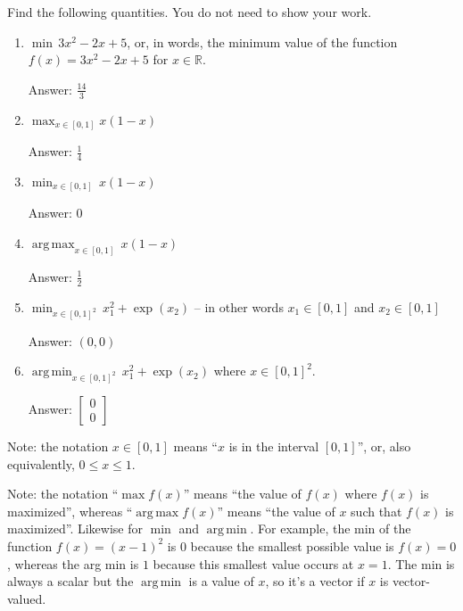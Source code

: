 \documentclass{article}
\newcommand{\blu}[1]{{\textcolor{blu}{#1}}}
\newenvironment{answer}{\par\begingroup\color{gre}Answer: }{\endgroup}
\let\ask\blu
\def\R{\mathbb{R}}
\DeclareMathOperator*{\argmax}{arg\,max}
\DeclareMathOperator*{\argmin}{arg\,min}
\begin{document}
  \ask{Find the following quantities.} You do not need to show your work.


  \begin{enumerate}
  \item $\min \, 3x^2-2x+5$, or, in words, the minimum value of the function $f(x) = 3x^2 -2x + 5$ for $x \in \R$.
  \begin{answer}
  $
  \frac{14}{3}
  $
  \end{answer}
  \item $\max_{x \in [0, 1]} x(1-x)$
  \begin{answer}
  $
  \frac{1}{4}
  $
  \end{answer}
  \item $\min_{x \in [0, 1]} \, x(1-x)$
  \begin{answer}
  0
  \end{answer}
  \item $\argmax_{x \in [0,1]} \, x(1-x)$
  \begin{answer}
  $
  \frac{1}{2}
  $
  \end{answer}
  \item $\min_{x \in [0, 1]^2} \, x_1^2 + \exp(x_2)$ -- in other words $x_1\in [0,1]$ and $x_2\in [0,1]$
  \begin{answer}
  $
  (0, 0)
  $
  \end{answer}
  \item $\argmin_{x \in [0,1]^2} \, x_1^2 + \exp(x_2)$ where $x \in [0,1]^2$.
  \begin{answer}
  $ \left[
    \begin{array} { c }
    0 \\
    0
    \end{array}
    \right] 
  $
  \end{answer}
  \end{enumerate}

  Note: the notation $x\in [0,1]$ means ``$x$ is in the interval $[0,1]$'', or, also equivalently, $0 \leq x \leq 1$.

  Note: the notation ``$\max f(x)$'' means ``the value of $f(x)$ where $f(x)$ is maximized'', whereas ``$\argmax  f(x)$'' means ``the value of $x$ such that $f(x)$ is maximized''.
  Likewise for $\min$ and $\argmin$. For example, the min of the function $f(x)=(x-1)^2$ is $0$ because the smallest possible value is $f(x)=0$,
  whereas the arg min is $1$ because this smallest value occurs at $x=1$. The min is always a scalar but the $\argmin$ is a value of $x$, so it's a vector
  if $x$ is vector-valued.
\end{document}
